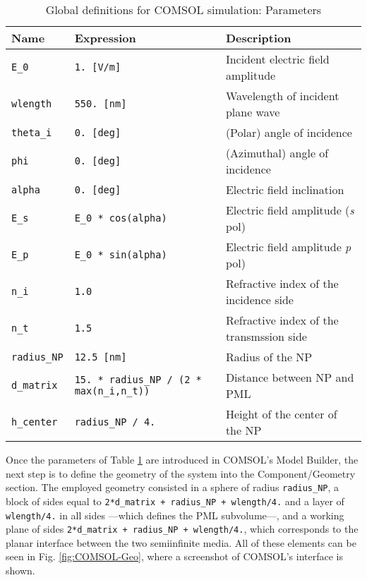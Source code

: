 \begin{table}[t!]
 \caption{Global definitions for COMSOL simulation: Parameters }
 \label{tab:Global-parameters}
 \centering
 \small
    \begin{tabular}{ |l|l|l| }
     \hline
     \textbf{Name}          &   \textbf{Expression}                              &   \textbf{Description} \\ \hline \hline
     \lstinline!E_0!        &   \lstinline!1. [V/m]!                             &   Incident electric field amplitude \\
     \lstinline!wlength!    &   \lstinline!550. [nm]!                            &   Wavelength of incident plane wave \\
     \lstinline!theta_i!    &   \lstinline!0. [deg]!                             &   (Polar) angle of incidence \\
     \lstinline!phi!        &   \lstinline!0. [deg]!                             &   (Azimuthal) angle of incidence \\
     \lstinline!alpha!      &   \lstinline!0. [deg]!                             &   Electric field inclination \\
     \lstinline!E_s!        &   \lstinline!E_0 * cos(alpha)!                     &   Electric field amplitude (\textit{s} pol) \\
     \lstinline!E_p!        &   \lstinline!E_0 * sin(alpha)!                     &   Electric field amplitude \textit{p} pol) \\
     \lstinline!n_i!        &   \lstinline!1.0!                                  &   Refractive index of the incidence side \\
     \lstinline!n_t!        &   \lstinline!1.5!                                  &   Refractive index of the transmssion side \\
     \lstinline!radius_NP!  &   \lstinline!12.5 [nm]!                            &   Radius of the NP  \\
     \lstinline!d_matrix!   &   \lstinline!15. * radius_NP / (2 * max(n_i,n_t))! &   Distance between NP and PML \\
     \lstinline!h_center!   &   \lstinline!radius_NP / 4.!                       &   Height of the center of the NP\\
     \hline \hline
    \end{tabular}
\end{table}

Once the parameters of Table \ref{tab:Global-parameters} are introduced in COMSOL's Model Builder, the next step is to define the geometry of the system into the Component/Geometry section. The employed geometry consisted in a sphere of radius \lstinline!radius_NP!, a block of sides equal to \lstinline!2*d_matrix + radius_NP + wlength/4.! and a layer of \lstinline!wlength/4.! in all sides ---which defines the PML subvolume---, and a working plane of sides \lstinline!2*d_matrix + radius_NP + wlength/4.!, which corresponds to the planar interface between the two semiinfinite media. All of these elements can be seen in Fig. \ref{fig:COMSOL-Geo}, where a screenshot of COMSOL's interface is shown.

